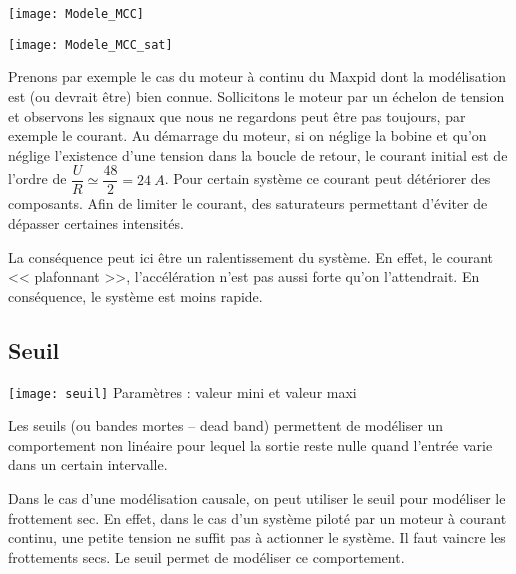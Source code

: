 \begin{marginfigure}
\texttt{[image: Modele\_MCC]}

\texttt{[image: Modele\_MCC\_sat]}
\end{marginfigure}
\begin{exemple}[title=Exemple] 

Prenons par exemple le cas du moteur à continu du Maxpid dont la modélisation est (ou devrait être)  bien connue. Sollicitons le moteur par un échelon de tension et observons les signaux que nous ne regardons peut être pas toujours, par exemple le courant. 
Au démarrage du moteur, si on néglige la bobine et qu'on néglige l'existence d'une tension dans la boucle de retour, le courant initial est de l'ordre de $\dfrac{U}{R}\simeq \dfrac{48}{2}=\SI{24}{A}$. Pour certain système ce courant peut détériorer des composants. Afin de limiter le courant, des saturateurs permettant d'éviter de dépasser certaines intensités. 

La conséquence peut ici être un ralentissement du système. En effet, le courant << plafonnant >>, l'accélération n'est pas aussi forte qu'on l'attendrait. En conséquence, le système est moins rapide. 

\end{exemple}

\subsection{Seuil}

\begin{marginfigure}[-2cm]
\centering
\texttt{[image: seuil]}
Paramètres : valeur mini et valeur maxi
\end{marginfigure}

\begin{marginfigure}[1cm]
\centering
{}
\end{marginfigure}


Les seuils (ou bandes mortes -- dead band) permettent de modéliser un comportement non linéaire pour lequel la sortie reste nulle quand l'entrée varie dans un certain intervalle. 

Dans le cas d'une modélisation causale, on peut utiliser le seuil pour modéliser le frottement sec. En effet, dans le cas d'un système piloté par un moteur à courant continu, une petite tension ne suffit pas à actionner le système. Il faut vaincre les frottements secs. Le seuil permet de modéliser ce comportement.



